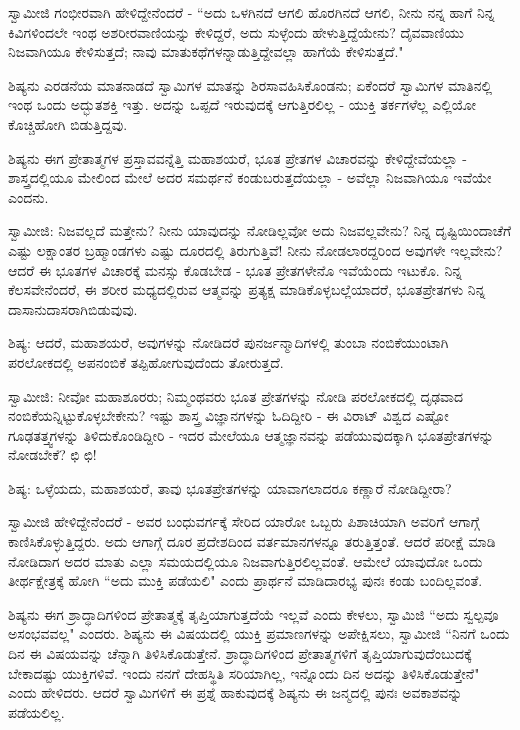 ಸ್ವಾಮೀಜಿ ಗಂಭೀರವಾಗಿ ಹೇಳಿದ್ದೇನೆಂದರೆ - “ಅದು ಒಳಗಿನದೆ ಆಗಲಿ ಹೊರಗಿನದೆ ಆಗಲಿ, ನೀನು ನನ್ನ ಹಾಗೆ ನಿನ್ನ ಕಿವಿಗಳಿಂದಲೇ ಇಂಥ ಅಶರೀರವಾಣಿಯನ್ನು ಕೇಳಿದ್ದರೆ, ಅದು ಸುಳ್ಳೆಂದು ಹೇಳುತ್ತಿದ್ದೆಯೇನು? ದೈವವಾಣಿಯು ನಿಜವಾಗಿಯೂ ಕೇಳಿಸುತ್ತದೆ; ನಾವು ಮಾತುಕಥೆಗಳನ್ನಾಡುತ್ತಿದ್ದೇವಲ್ಲಾ ಹಾಗೆಯೆ ಕೇಳಿಸುತ್ತದೆ."

ಶಿಷ್ಯನು ಎರಡನೆಯ ಮಾತನಾಡದೆ ಸ್ವಾಮಿಗಳ ಮಾತನ್ನು ಶಿರಸಾವಹಿಸಿಕೊಂಡನು; ಏಕೆಂದರೆ ಸ್ವಾಮಿಗಳ ಮಾತಿನಲ್ಲಿ ಇಂಥ ಒಂದು ಅದ್ಭುತಶಕ್ತಿ ಇತ್ತು. ಅದನ್ನು ಒಪ್ಪದೆ ಇರುವುದಕ್ಕೆ ಆಗುತ್ತಿರಲಿಲ್ಲ - ಯುಕ್ತಿ ತರ್ಕಗಳೆಲ್ಲ ಎಲ್ಲಿಯೋ ಕೊಚ್ಚಿಹೋಗಿ ಬಿಡುತ್ತಿದ್ದವು.

ಶಿಷ್ಯನು ಈಗ ಪ್ರೇತಾತ್ಮಗಳ ಪ್ರಸ್ತಾವವನ್ನೆತ್ತಿ ಮಹಾಶಯರೆ, ಭೂತ ಪ್ರೇತಗಳ ವಿಚಾರವನ್ನು ಕೇಳಿದ್ದೇವೆಯಲ್ಲಾ - ಶಾಸ್ತ್ರದಲ್ಲಿಯೂ ಮೇಲಿಂದ ಮೇಲೆ ಅದರ ಸಮರ್ಥನೆ ಕಂಡುಬರುತ್ತದೆಯಲ್ಲಾ - ಅವೆಲ್ಲಾ ನಿಜವಾಗಿಯೂ ಇವೆಯೇ ಎಂದನು.

ಸ್ವಾಮೀಜಿ: ನಿಜವಲ್ಲದೆ ಮತ್ತೇನು? ನೀನು ಯಾವುದನ್ನು ನೋಡಿಲ್ಲವೋ ಅದು ನಿಜವಲ್ಲವೇನು? ನಿನ್ನ ದೃಷ್ಟಿಯಿಂದಾಚೆಗೆ ಎಷ್ಟು ಲಕ್ಷಾಂತರ ಬ್ರಹ್ಮಾಂಡಗಳು ಎಷ್ಟು ದೂರದಲ್ಲಿ ತಿರುಗುತ್ತಿವೆ! ನೀನು ನೋಡಲಾರದ್ದರಿಂದ ಅವುಗಳೇ ಇಲ್ಲವೇನು? ಆದರೆ ಈ ಭೂತಗಳ ವಿಚಾರಕ್ಕೆ ಮನಸ್ಸು ಕೊಡಬೇಡ - ಭೂತ ಪ್ರೇತಗಳೇನೊ ಇವೆಯೆಂದು ಇಟುಕೊ. ನಿನ್ನ ಕೆಲಸವೇನೆಂದರೆ, ಈ ಶರೀರ ಮಧ್ಯದಲ್ಲಿರುವ ಆತ್ಮವನ್ನು ಪ್ರತ್ಯಕ್ಷ ಮಾಡಿಕೊಳ್ಳಬಲ್ಲೆಯಾದರೆ, ಭೂತಪ್ರೇತಗಳು ನಿನ್ನ ದಾಸಾನುದಾಸರಾಗಿಬಿಡುವುವು.

ಶಿಷ್ಯ: ಆದರೆ, ಮಹಾಶಯರೆ, ಅವುಗಳನ್ನು ನೋಡಿದರೆ ಪುನರ್ಜನ್ಮಾದಿಗಳಲ್ಲಿ ತುಂಬಾ ನಂಬಿಕೆಯುಂಟಾಗಿ ಪರಲೋಕದಲ್ಲಿ ಅಪನಂಬಿಕೆ ತಪ್ಪಿಹೋಗುವುದೆಂದು ತೋರುತ್ತದೆ.

ಸ್ವಾಮೀಜಿ: ನೀವೋ ಮಹಾಶೂರರು; ನಿಮ್ಮಂಥವರು ಭೂತ ಪ್ರೇತಗಳನ್ನು ನೋಡಿ ಪರಲೋಕದಲ್ಲಿ ದೃಢವಾದ ನಂಬಿಕೆಯನ್ನಿಟ್ಟುಕೊಳ್ಳಬೇಕೇನು? ಇಷ್ಟು ಶಾಸ್ತ್ರ ವಿಜ್ಞಾನಗಳನ್ನು ಓದಿದ್ದೀರಿ - ಈ ವಿರಾಟ್ ವಿಶ್ವದ ಎಷ್ಟೋ ಗೂಢತತ್ತ್ವಗಳನ್ನು ತಿಳಿದುಕೊಂಡಿದ್ದೀರಿ - ಇದರ ಮೇಲೆಯೂ ಆತ್ಮಜ್ಞಾನವನ್ನು ಪಡೆಯುವುದಕ್ಕಾಗಿ ಭೂತಪ್ರೇತಗಳನ್ನು ನೋಡಬೇಕೆ? ಛಿ ಛಿ!

ಶಿಷ್ಯ: ಒಳ್ಳೆಯದು, ಮಹಾಶಯರೆ, ತಾವು ಭೂತಪ್ರೇತಗಳನ್ನು ಯಾವಾಗಲಾದರೂ ಕಣ್ಣಾರೆ ನೋಡಿದ್ದೀರಾ?

ಸ್ವಾಮೀಜಿ ಹೇಳಿದ್ದೇನೆಂದರೆ - ಅವರ ಬಂಧುವರ್ಗಕ್ಕೆ ಸೇರಿದ ಯಾರೋ ಒಬ್ಬರು ಪಿಶಾಚಿಯಾಗಿ ಅವರಿಗೆ ಆಗಾಗ್ಗೆ ಕಾಣಿಸಿಕೊಳ್ಳುತ್ತಿದ್ದರು. ಅದು ಆಗಾಗ್ಗೆ ದೂರ ಪ್ರದೇಶದಿಂದ ವರ್ತಮಾನಗಳನ್ನೂ ತರುತ್ತಿತ್ತಂತೆ. ಆದರೆ ಪರೀಕ್ಷೆ ಮಾಡಿ ನೋಡಿದಾಗ ಅದರ ಮಾತು ಎಲ್ಲಾ ಸಮಯದಲ್ಲಿಯೂ ನಿಜವಾಗುತ್ತಿರಲಿಲ್ಲವಂತೆ. ಆಮೇಲೆ ಯಾವುದೋ ಒಂದು ತೀರ್ಥಕ್ಷೇತ್ರಕ್ಕೆ ಹೋಗಿ “ಅದು ಮುಕ್ತಿ ಪಡೆಯಲಿ" ಎಂದು ಪ್ರಾರ್ಥನೆ ಮಾಡಿದಾರಭ್ಯ ಪುನಃ ಕಂಡು ಬಂದಿಲ್ಲವಂತೆ.

ಶಿಷ್ಯನು ಈಗ ಶ್ರಾದ್ಧಾದಿಗಳಿಂದ ಪ್ರೇತಾತ್ಮಕ್ಕೆ ತೃಪ್ತಿಯಾಗುತ್ತದೆಯೆ ಇಲ್ಲವೆ ಎಂದು ಕೇಳಲು, ಸ್ವಾಮಿಜಿ “ಅದು ಸ್ವಲ್ಪವೂ ಅಸಂಭವವಲ್ಲ" ಎಂದರು. ಶಿಷ್ಯನು ಈ ವಿಷಯದಲ್ಲಿ ಯುಕ್ತಿ ಪ್ರಮಾಣಗಳನ್ನು ಅಪೇಕ್ಷಿಸಲು, ಸ್ವಾಮೀಜಿ “ನಿನಗೆ ಒಂದು ದಿನ ಈ ವಿಷಯವನ್ನು ಚೆನ್ನಾಗಿ ತಿಳಿಸಿಕೊಡುತ್ತೇನೆ. ಶ್ರಾದ್ಧಾದಿಗಳಿಂದ ಪ್ರೇತಾತ್ಮಗಳಿಗೆ ತೃಪ್ತಿಯಾಗುವುದೆಂಬುದಕ್ಕೆ ಬೇಕಾದಷ್ಟು ಯುಕ್ತಿಗಳಿವೆ. ಇಂದು ನನಗೆ ದೇಹಸ್ಥಿತಿ ಸರಿಯಾಗಿಲ್ಲ, ಇನ್ನೊಂದು ದಿನ ಅದನ್ನು ತಿಳಿಸಿಕೊಡುತ್ತೇನೆ" ಎಂದು ಹೇಳಿದರು. ಆದರೆ ಸ್ವಾಮಿಗಳಿಗೆ ಈ ಪ್ರಶ್ನೆ ಹಾಕುವುದಕ್ಕೆ ಶಿಷ್ಯನು ಈ ಜನ್ಮದಲ್ಲಿ ಪುನಃ ಅವಕಾಶವನ್ನು ಪಡೆಯಲಿಲ್ಲ.

